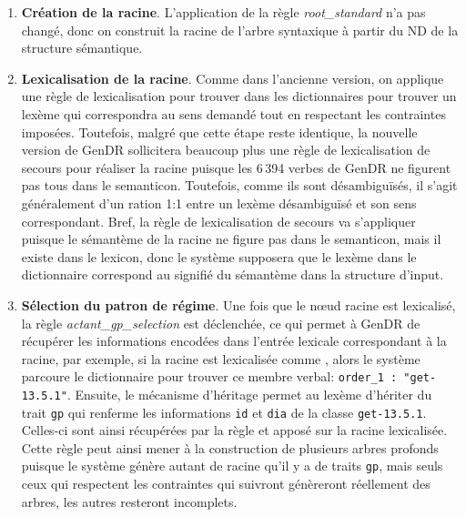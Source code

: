 \begin{enumerate}
  \item \textbf{Création de la racine}.
  L'application de la règle \emph{root\_standard} n'a pas changé, donc on construit la racine de l'arbre syntaxique à partir du \ac{ND} de la structure sémantique.

  \item \textbf{Lexicalisation de la racine}.
  Comme dans l'ancienne version, on applique une règle de lexicalisation pour trouver dans les dictionnaires pour trouver un lexème qui correspondra au sens demandé tout en respectant les contraintes imposées. Toutefois, malgré que cette étape reste identique, la nouvelle version de GenDR sollicitera beaucoup plus une règle de lexicalisation de secours pour réaliser la racine puisque les 6\,394 verbes de GenDR ne figurent pas tous dans le semanticon. Toutefois, comme ils sont désambiguïsés, il s'agit généralement d'un ration 1:1 entre un lexème désambiguïsé et son sens correspondant. Bref, la règle de lexicalisation de secours va s'appliquer puisque le sémantème de la racine ne figure pas dans le semanticon, mais il existe dans le lexicon, donc le système supposera que le lexème dans le dictionnaire correspond au signifié du sémantème dans la structure d'input.

  \item \textbf{Sélection du patron de régime}.
  Une fois que le n\oe{}ud racine est lexicalisé, la règle \emph{actant\_gp\_selection} est déclenchée, ce qui permet à GenDR de récupérer les informations encodées dans l'entrée lexicale correspondant à la racine, par exemple, si la racine est lexicalisée comme , alors le système parcoure le dictionnaire pour trouver ce membre verbal: \lstinline|order_1 : "get-13.5.1"|. Ensuite, le mécanisme d'héritage permet au lexème  d'hériter du trait \texttt{gp} qui renferme les informations \texttt{id} et \texttt{dia} de la classe \texttt{get-13.5.1}. Celles-ci sont ainsi récupérées par la règle et apposé sur la racine lexicalisée. Cette règle peut ainsi mener à la construction de plusieurs arbres profonds puisque le système génère autant de racine qu'il y a de traits \texttt{gp}, mais seuls ceux qui respectent les contraintes qui suivront génèreront réellement des arbres, les autres resteront incomplets.
	

\end{enumerate}
